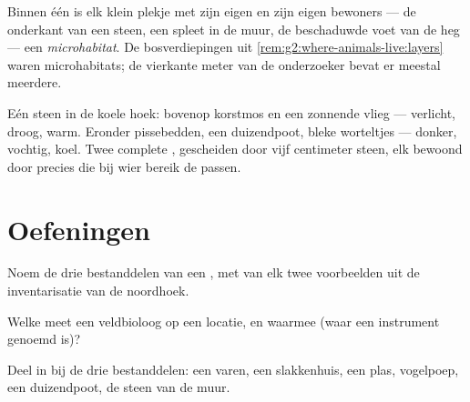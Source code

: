 \begin{definition}[Microhabitat]\label{def:g6:exploring-our-environment:microhabitat}
Binnen één  is elk klein plekje met zijn eigen  en
zijn eigen bewoners --- de onderkant van een steen, een spleet in de
muur, de beschaduwde voet van de heg --- een
\emph{microhabitat}. De bosverdiepingen uit
\cref{rem:g2:where-animals-live:layers} waren microhabitats; de vierkante
meter van de onderzoeker bevat er meestal meerdere.
\end{definition}

\begin{example}\label{ex:g6:exploring-our-environment:stone}
Eén steen in de koele hoek: bovenop korstmos en een zonnende vlieg ---
verlicht, droog, warm. Eronder pissebedden, een duizendpoot, bleke
worteltjes --- donker, vochtig, koel. Twee complete ,
gescheiden door vijf centimeter steen, elk bewoond door precies die
 bij wier bereik de  passen.
\end{example}

\section{Oefeningen}

\begin{exercise}[$\star$]\label{exo:g6:exploring-our-environment:1}
Noem de drie  bestanddelen van een , met van elk twee
voorbeelden uit de inventarisatie van de noordhoek.
\end{exercise}

\begin{exercise}[$\star$]\label{exo:g6:exploring-our-environment:2}
Welke  meet een veldbioloog op een locatie, en waarmee
(waar een instrument genoemd is)?
\end{exercise}

\begin{exercise}[$\star$]\label{exo:g6:exploring-our-environment:3}
Deel in bij de drie  bestanddelen: een varen, een slakkenhuis,
een plas, vogelpoep, een duizendpoot, de steen van de muur.
\end{exercise}

